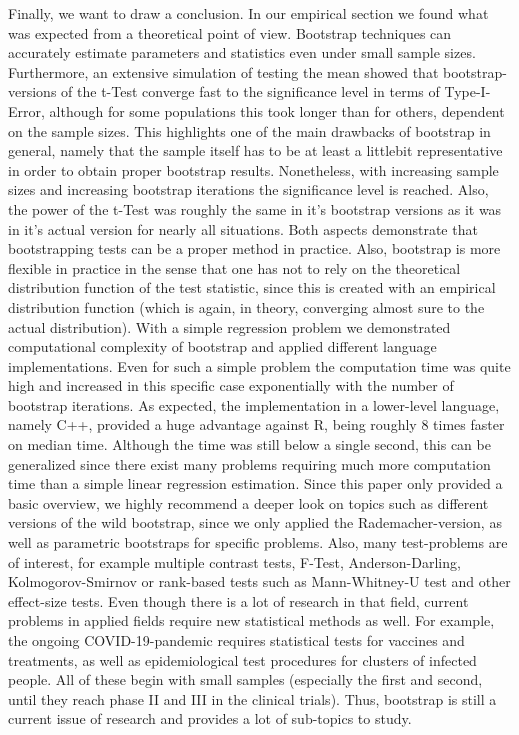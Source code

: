 Finally, we want to draw a conclusion. In our empirical section we found what was expected from a theoretical point of view. Bootstrap techniques can accurately estimate parameters and statistics even under small sample sizes. Furthermore, an extensive simulation of testing the mean showed that bootstrap-versions of the t-Test converge fast to the significance level in terms of Type-I-Error, although for some populations this took longer than for others, dependent on the sample sizes. This highlights one of the main drawbacks of bootstrap in general, namely that the sample itself has to be at least a littlebit representative in order to obtain proper bootstrap results. Nonetheless, with increasing sample sizes and increasing bootstrap iterations the significance level is reached. Also, the power of the t-Test was roughly the same in it's bootstrap versions as it was in it's actual version for nearly all situations. Both aspects demonstrate that bootstrapping tests can be a proper method in practice. Also, bootstrap is more flexible in practice in the sense that one has not to rely on the theoretical distribution function of the test statistic, since this is created with an empirical distribution function (which is again, in theory, converging almost sure to the actual distribution). With a simple regression problem we demonstrated computational complexity of bootstrap and applied different language implementations. Even for such a simple problem the computation time was quite high and increased in this specific case exponentially with the number of bootstrap iterations. As expected, the implementation in a lower-level language, namely C++, provided a huge advantage against R, being roughly $8$ times faster on median time. Although the time was still below a single second, this can be generalized since there exist many problems requiring much more computation time than a simple linear regression estimation. Since this paper only provided a basic overview, we highly recommend a deeper look on topics such as different versions of the wild bootstrap, since we only applied the Rademacher-version, as well as parametric bootstraps for specific problems. Also, many test-problems are of interest, for example multiple contrast tests, F-Test, Anderson-Darling, Kolmogorov-Smirnov or rank-based tests such as Mann-Whitney-U test and other effect-size tests. Even though there is a lot of research in that field, current problems in applied fields require new statistical methods as well. For example, the ongoing COVID-19-pandemic requires statistical tests for vaccines and treatments, as well as epidemiological test procedures for clusters of infected people. All of these begin with small samples (especially the first and second, until they reach phase II and III in the clinical trials). Thus, bootstrap is still a current issue of research and provides a lot of sub-topics to study.